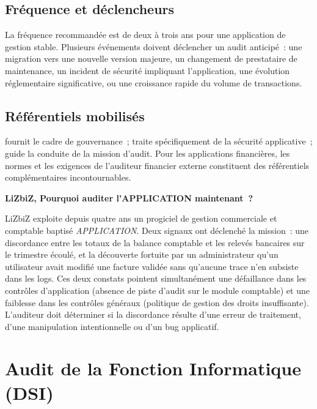 \subsection{Fréquence et déclencheurs}

La fréquence recommandée est de deux à trois ans pour une application de gestion
stable. Plusieurs événements doivent déclencher un audit anticipé~: une migration
vers une nouvelle version majeure, un changement de prestataire de maintenance,
un incident de sécurité impliquant l'application, une évolution réglementaire
significative, ou une croissance rapide du volume de transactions.

\subsection{Référentiels mobilisés}

 fournit le cadre de gouvernance~;  traite
spécifiquement de la sécurité applicative~;  guide la conduite de
la mission d'audit. Pour les applications financières, les normes 
et les exigences de l'auditeur financier externe constituent des référentiels
complémentaires incontournables.

\begin{boxlizbiz}
\textbf{LiZbiZ, Pourquoi auditer l'APPLICATION maintenant~?}

LiZbiZ exploite depuis quatre ans un progiciel de gestion commerciale et comptable
baptisé \textit{APPLICATION}. Deux signaux ont déclenché la mission~: une
discordance entre les totaux de la balance comptable et les relevés bancaires sur
le trimestre écoulé, et la découverte fortuite par un administrateur qu'un
utilisateur avait modifié une facture validée sans qu'aucune trace n'en subsiste
dans les logs. Ces deux constats pointent simultanément une défaillance dans les
contrôles d'application (absence de piste d'audit sur le module comptable) et une
faiblesse dans les contrôles généraux (politique de gestion des droits insuffisante).
L'auditeur doit déterminer si la discordance résulte d'une erreur de traitement,
d'une manipulation intentionnelle ou d'un bug applicatif.
\end{boxlizbiz}


\section{Audit de la Fonction Informatique (DSI)}
\label{sec:audit-dsi}

